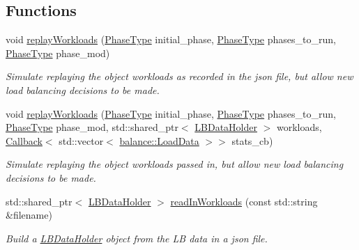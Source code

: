 \subsection*{Functions}
\begin{DoxyCompactItemize}
\item 
void \hyperlink{namespacevt_1_1vrt_1_1collection_1_1balance_1_1replay_a4923aa281087b1b8c161372c1742be4e}{replay\+Workloads} (\hyperlink{namespacevt_a46ce6733d5cdbd735d561b7b4029f6d7}{Phase\+Type} initial\+\_\+phase, \hyperlink{namespacevt_a46ce6733d5cdbd735d561b7b4029f6d7}{Phase\+Type} phases\+\_\+to\+\_\+run, \hyperlink{namespacevt_a46ce6733d5cdbd735d561b7b4029f6d7}{Phase\+Type} phase\+\_\+mod)
\begin{DoxyCompactList}\small\item\em Simulate replaying the object workloads as recorded in the json file, but allow new load balancing decisions to be made. \end{DoxyCompactList}\item 
void \hyperlink{namespacevt_1_1vrt_1_1collection_1_1balance_1_1replay_ae14719e5612680a87f68f2d9057cb67f}{replay\+Workloads} (\hyperlink{namespacevt_a46ce6733d5cdbd735d561b7b4029f6d7}{Phase\+Type} initial\+\_\+phase, \hyperlink{namespacevt_a46ce6733d5cdbd735d561b7b4029f6d7}{Phase\+Type} phases\+\_\+to\+\_\+run, \hyperlink{namespacevt_a46ce6733d5cdbd735d561b7b4029f6d7}{Phase\+Type} phase\+\_\+mod, std\+::shared\+\_\+ptr$<$ \hyperlink{structvt_1_1vrt_1_1collection_1_1balance_1_1_l_b_data_holder}{L\+B\+Data\+Holder} $>$ workloads, \hyperlink{namespacevt_a57b238783d05de96bc2c4027f7073b7f}{Callback}$<$ std\+::vector$<$ \hyperlink{structvt_1_1vrt_1_1collection_1_1balance_1_1_load_data}{balance\+::\+Load\+Data} $>$$>$ stats\+\_\+cb)
\begin{DoxyCompactList}\small\item\em Simulate replaying the object workloads passed in, but allow new load balancing decisions to be made. \end{DoxyCompactList}\item 
std\+::shared\+\_\+ptr$<$ \hyperlink{structvt_1_1vrt_1_1collection_1_1balance_1_1_l_b_data_holder}{L\+B\+Data\+Holder} $>$ \hyperlink{namespacevt_1_1vrt_1_1collection_1_1balance_1_1replay_a2177c340e50c514aa567bde597a58139}{read\+In\+Workloads} (const std\+::string \&filename)
\begin{DoxyCompactList}\small\item\em Build a \hyperlink{structvt_1_1vrt_1_1collection_1_1balance_1_1_l_b_data_holder}{L\+B\+Data\+Holder} object from the LB data in a json file. \end{DoxyCompactList}\end{DoxyCompactItemize}


